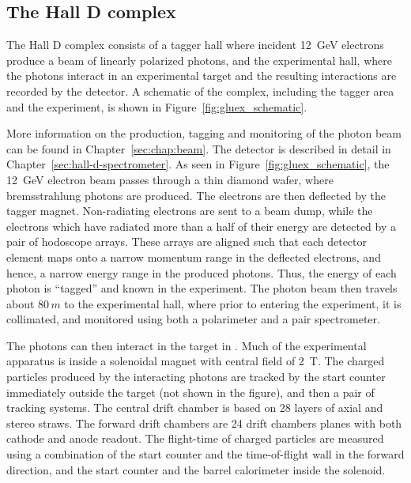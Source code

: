 \subsection[The Hall D complex]{The Hall D complex \label{sec:gluexexperiment:complex}}
The Hall D complex consists of a tagger hall where incident 12~GeV electrons produce
a beam of linearly polarized photons, and the experimental hall, where the photons interact
in an experimental target and the resulting interactions are recorded by the \GX{} detector.
A schematic of the complex, including the tagger area and the \GX{} experiment, is shown 
in Figure~\ref{fig:gluex_schematic}.

More information on the production, tagging and monitoring of the photon beam can be found in
Chapter~\ref{sec:chap:beam}. The \GX{} detector is described in detail in 
Chapter~\ref{sec:hall-d-spectrometer}.
\label{sec:intro:detector}
As seen in Figure~\ref{fig:gluex_schematic}, the 12~GeV electron beam passes through a 
thin diamond wafer, where bremsstrahlung photons are produced. The electrons are then deflected
by the tagger magnet. Non-radiating electrons are sent to a beam dump, while the electrons which
have radiated more than a half of their energy
are detected by a pair of hodoscope arrays. These arrays are aligned such that each detector element
maps onto a narrow momentum range in the deflected electrons, and hence, a narrow energy range
in the produced photons. Thus, the energy of each photon is ``tagged'' and known in  the experiment.
The photon beam then travels about $80\, m$ to the experimental hall, where prior to entering the
experiment, it is collimated, and monitored using both a polarimeter and a pair spectrometer.

The photons can then interact in the target in \GX{}. Much of the experimental apparatus is inside
a solenoidal magnet with central field of 2~T. The charged particles produced by the interacting
photons are tracked by the start counter immediately outside the target (not shown in the figure),
and then a pair of tracking systems. The central drift chamber is based on 28 layers of axial and stereo
straws. The forward drift chambers are 24 drift chambers planes with both cathode
and anode readout.  The flight-time of charged
particles are measured using a combination of the start counter and the time-of-flight wall in the forward
direction, and the start counter and the barrel calorimeter inside the solenoid.

